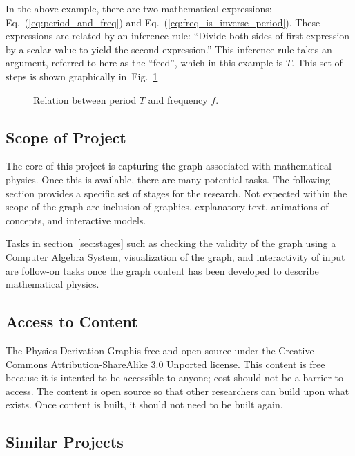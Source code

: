 \documentclass{article}
\newcommand{\eqn}[1]{Eq.\ (\ref{#1})}
\newcommand{\pdg}{Physics Derivation Graph}
\begin{document}
\begin{multicols}{2}
In the above example, there are two mathematical expressions: \eqn{eq:period_and_freq} and \eqn{eq:freq_is_inverse_period}. These expressions are related by an inference rule: ``Divide both sides of first expression by a scalar value to yield the second expression.'' This inference rule takes an argument, referred to here as the ``feed'', which in this example is $T$. This set of steps is shown graphically in~Fig.~\ref{fig:freq_period}

\begin{center}
\begin{figure}
\caption{Relation between period $T$ and frequency $f$.\label{fig:freq_period}}
\end{figure}
\end{center}

\subsection{Scope of Project\label{sec:scope}}

The core of this project is capturing the graph associated with mathematical physics. Once this is available, there are many potential tasks. The following section provides a specific set of stages for the research. Not expected within the scope of the graph are inclusion of graphics, explanatory text, animations of concepts, and interactive models. 

Tasks in section~\ref{sec:stages} such as checking the validity of the graph using a Computer Algebra System, visualization of the graph, and interactivity of input are follow-on tasks once the graph content has been developed to describe mathematical physics.

\subsection{Access to Content\label{sec:access}}

The \pdg is free and open source under the Creative Commons Attribution-ShareAlike 3.0 Unported license. This content is free because it is intented to be accessible to anyone; cost should not be a barrier to access. The content is open source so that other researchers can build upon what exists. Once content is built, it should not need to be built again. 

\subsection{Similar Projects\label{sec:similar_projects}}


\end{multicols}
\end{document}
